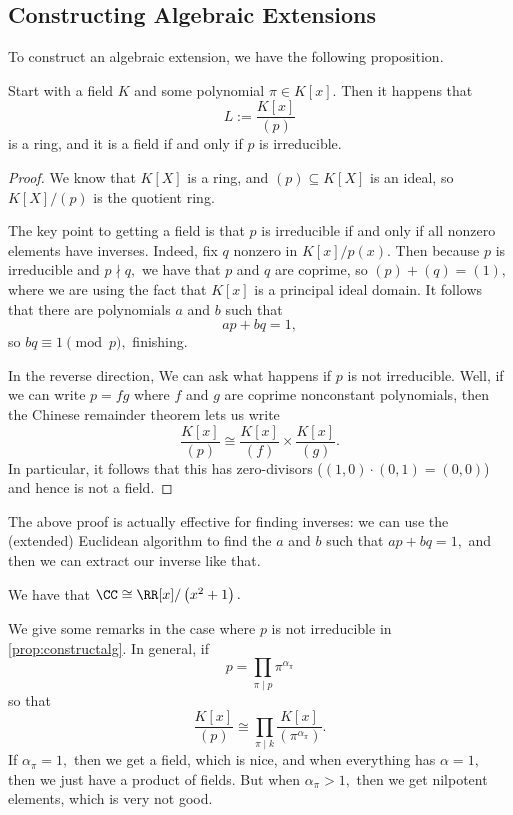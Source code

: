 \subsection{Constructing Algebraic Extensions}
To construct an algebraic extension, we have the following proposition.
\begin{proposition} \label{prop:constructalg}
	Start with a field $K$ and some polynomial $\pi\in K[x].$ Then it happens that
	\[L:=\frac{K[x]}{(p)}\]
	is a ring, and it is a field if and only if $p$ is irreducible. 
\end{proposition}
\begin{proof}
	We know that $K[X]$ is a ring, and $(p)\subseteq K[X]$ is an ideal, so $K[X]/(p)$ is the quotient ring.
	
	The key point to getting a field is that $p$ is irreducible if and only if all nonzero elements have inverses. Indeed, fix $q$ nonzero in $K[x]/p(x).$ Then because $p$ is irreducible and $p\nmid q,$ we have that $p$ and $q$ are coprime, so $(p)+(q)=(1),$ where we are using the fact that $K[x]$ is a principal ideal domain. It follows that there are polynomials $a$ and $b$ such that
	\[ap+bq=1,\]
	so $bq\equiv1\pmod p,$ finishing.

	In the reverse direction, We can ask what happens if $p$ is not irreducible. Well, if we can write $p=fg$ where $f$ and $g$ are coprime nonconstant polynomials, then the Chinese remainder theorem lets us write
	\[\frac{K[x]}{(p)}\cong\frac{K[x]}{(f)}\times\frac{K[x]}{(g)}.\]
	In particular, it follows that this has zero-divisors ($(1,0)\cdot(0,1)=(0,0)$) and hence is not a field.
\end{proof}
\begin{remark}
	The above proof is actually effective for finding inverses: we can use the (extended) Euclidean algorithm to find the $a$ and $b$ such that $ap+bq=1,$ and then we can extract our inverse like that.
\end{remark}
\begin{example}
	We have that $\CC\cong\RR[x]/\left(x^2+1\right).$
\end{example}
We give some remarks in the case where $p$ is not irreducible in \autoref{prop:constructalg}. In general, if
\[p=\prod_{\pi\mid p}\pi^{\alpha_\pi}\]
so that
\[\frac{K[x]}{(p)}\cong\prod_{\pi\mid k}\frac{K[x]}{(\pi^{\alpha_\pi})}.\]
If $\alpha_\pi=1,$ then we get a field, which is nice, and when everything has $\alpha=1,$ then we just have a product of fields. But when $\alpha_\pi>1,$ then we get nilpotent elements, which is very not good.

